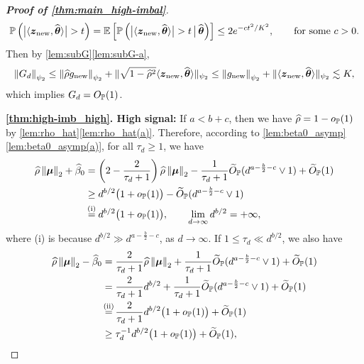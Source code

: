 \begin{proof}[\textbf{Proof of \cref{thm:main_high-imbal}}]
\begin{equation*}
     \P\left( \bigl| \< \zz_\mathrm{new}, \hat\vtheta \> \bigr| > t \right)
     =  \E\left[ \P\left( \bigl| \< \zz_\mathrm{new}, \hat\vtheta \> \bigr| > t \,\big|\, \hat\vtheta \right) \right]
     \le 2 e^{-ct^2/K^2}, \qquad \text{for some} ~ c > 0.
\end{equation*}
Then by \cref{lem:subG}\ref{lem:subG-a},
\begin{equation*}
     \norm{G_d}_{\psi_2} \le 
     \norm{\hat\rho g_\mathrm{new}}_{\psi_2} + \| \sqrt{1 - \hat\rho^2} \< \zz_\mathrm{new}, \hat\vtheta \>\|_{\psi_2}
     \le \norm{g_\mathrm{new}}_{\psi_2} + \| \< \zz_\mathrm{new}, \hat\vtheta \> \|_{\psi_2} \lesssim K,
\end{equation*}
which implies $G_d = O_\P(1)$. 


\vspace{0.5\baselineskip}
\noindent
\textbf{\ref{thm:high-imb_high}. High signal:}
If $a < b + c$, then we have $\hat\rho = 1 - o_\P(1)$ by \cref{lem:rho_hat}\ref{lem:rho_hat(a)}. Therefore, according to \cref{lem:beta0_asymp}\ref{lem:beta0_asymp(a)}, for all $\tau_d \ge 1$, we have
\begin{align*}
        \hat\rho \norm{\vmu}_2 + \hat\beta_0
        & = \left(2 - \frac{2}{\tau_d + 1}\right) \hat\rho\norm{\vmu}_2 
        - \frac{1}{\tau_d + 1} \wt O_\P(d^{a-\frac{b}{2}-c} \vee 1) 
        + \wt O_\P(1) \\
        & \ge  d^{b/2}\bigl(1 + o_{\P}(1)\bigr)
        - \wt O_\P(d^{a-\frac{b}{2}-c} \vee 1)  \\
        & \overset{\mathmakebox[0pt][c]{\text{(i)}}}{=} d^{b/2}\bigl(1 + o_{\P}(1)\bigr),
        \qquad  \lim_{d \to \infty} d^{b/2} = +\infty,
\end{align*}
where (i) is because $d^{b/2} \gg d^{a-\frac{b}{2}-c}$, as $d \to \infty$. If $1 \le \tau_d \ll d^{b/2}$, we also have
\begin{align*}
    \hat\rho \norm{\vmu}_2 - \hat\beta_0
    & = \frac{2}{\tau_d + 1} \hat\rho\norm{\vmu}_2 
    + \frac{1}{\tau_d + 1} \wt O_\P(d^{a-\frac{b}{2}-c} \vee 1) + \wt O_\P(1) \\
    & = \frac{2}{\tau_d + 1} d^{b/2} 
    + \frac{1}{\tau_d + 1} \wt O_\P(d^{a-\frac{b}{2}-c} \vee 1) + \wt O_\P(1) \\
    & \overset{\mathmakebox[0pt][c]{\text{(ii)}}}{=} \frac{2}{\tau_d + 1} d^{b/2} \bigl(1 + o_{\P}(1)\bigr) + \wt O_\P(1) \\
    & \ge \tau_d^{-1} d^{b/2} \bigl(1 + o_{\P}(1)\bigr) + \wt O_\P(1),

\end{align*}
\end{proof}
